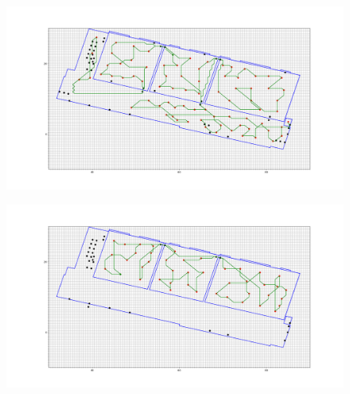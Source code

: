 \begin{figure}[H]
    \centering
    \includegraphics[width=1\textwidth]{fig/Resultater/127/0.31_min_height_radius0.1.png}
    \label{Rum knudepu}
    \caption[Design overview]{}
\end{figure}

\begin{figure}[H]
    \centering
    \includegraphics[width=1\textwidth]{fig/Resultater/127/0.31_min_height_radius0.01.png}
    \label{Rum knudepu}
    \caption[Design overview]{}
\end{figure}

